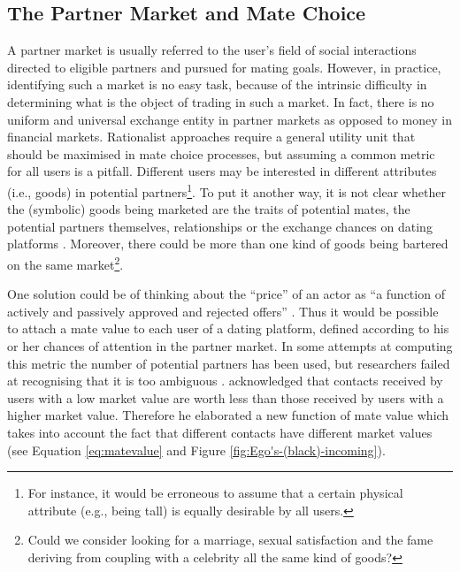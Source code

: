 \subsection{The Partner Market and Mate Choice\label{subsec:The-Partner-Market}}

A partner market is usually referred to the user's field of social
interactions directed to eligible partners and pursued for mating
goals. However, in practice, identifying such a market is no easy
task, because of the intrinsic difficulty in determining what is the
object of trading in such a market. In fact, there is no uniform and
universal exchange entity in partner markets \textendash{} as opposed
to money in financial markets. Rationalist approaches require a general
utility unit that should be maximised in mate choice processes, but
assuming a common metric for all users is a pitfall. Different users
may be interested in different attributes (i.e., goods) in potential
partners\footnote{For instance, it would be erroneous to assume that a certain physical
attribute (e.g., being tall) is equally desirable by all users.}. To put it another way, it is not clear whether the (symbolic) goods
being marketed are the traits of potential mates, the potential partners
themselves, relationships or the exchange chances on dating platforms
\citep{Schmitz2016The-Structure-o}. Moreover, there could be more
than one kind of goods being bartered on the same market\footnote{Could we consider looking for a marriage, sexual satisfaction and
the fame deriving from coupling with a celebrity all the same kind
of goods? }.

One solution could be of thinking about the \textquotedblleft price\textquotedblright{}
of an actor as \textquotedblleft a function of actively and passively
approved and rejected offers\textquotedblright{} \citep{Schmitz2016The-Structure-o}.
Thus it would be possible to attach a mate value to each user of a
dating platform, defined according to his or her chances of attention
in the partner market. In some attempts at computing this metric the
number of potential partners has been used, but researchers failed
at recognising that it is too ambiguous \citep[e.g.,][]{Pawowski1999Impact-of-marke}.
\citet{Schmitz2016The-Structure-o} acknowledged that contacts received
by users with a low market value are worth less than those received
by users with a higher market value. Therefore he elaborated a new
function of mate value which takes into account the fact that different
contacts have different market values (see Equation \ref{eq:matevalue}
and Figure \ref{fig:Ego's-(black)-incoming}). 


